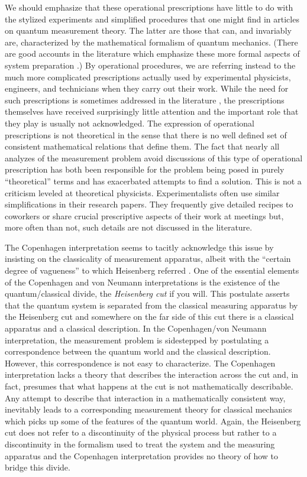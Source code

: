 \documentclass [12pt]{revtex4}
\begin{document}
We should emphasize that these operational prescriptions have little to do
with the stylized experiments and simplified procedures that one might
find in articles on quantum measurement theory.  The latter are those
that can, and invariably are, characterized by the mathematical formalism
of quantum mechanics. (There are good accounts in the literature which
emphasize these more formal aspects of system preparation \cite{L1969, B1998}.)
By operational procedures, we are referring instead to the much more
complicated prescriptions actually used by experimental physicists, engineers,
and technicians when they carry
out their work. While the need for such prescriptions is sometimes addressed
in the literature \cite{S1972, PB1992, P1995}, the prescriptions themselves have
 received surprisingly little attention and the important role that they play is
usually not acknowledged. The expression of operational prescriptions is not
{theoretical} in the sense that there is no well defined set
of consistent mathematical relations that define them. The fact that
nearly all analyzes of the measurement problem avoid discussions of
this type of operational prescription has both been responsible for
the problem being posed in purely ``theoretical'' terms and has
exacerbated attempts to find a solution. This is not a criticism leveled 
at theoretical physicists.
Experimentalists often use similar simplifications in their research
papers.  They frequently give detailed recipes to coworkers or
share crucial prescriptive aspects of their work at meetings but, more often
than not, such details are not discussed in the literature.

The Copenhagen interpretation
seems to tacitly acknowledge this issue by insisting on the classicality of
measurement apparatus, albeit with the ``certain degree of
vagueness'' to which Heisenberg referred \cite{S1972}.
One of the essential elements of the Copenhagen and von Neumann interpretations
is the existence of the quantum/classical divide, the \textit{Heisenberg cut}
if you will.  This postulate asserts that the quantum system is separated from
the classical measuring apparatus by the Heisenberg cut and somewhere on the far
side of this cut there is a classical apparatus and a classical description.
In the Copenhagen/von Neumann interpretation, the measurement problem is sidestepped 
by postulating a correspondence between the quantum world and
the classical description. However, this correspondence is not easy to characterize.
The Copenhagen interpretation lacks a theory that describes the interaction across the cut
and, in fact, presumes that what happens at the cut is not mathematically describable.
Any attempt to describe that interaction in a mathematically consistent way, inevitably
leads to a corresponding measurement theory for classical mechanics which picks up
some of the features of the quantum world. Again, the Heisenberg cut
does not refer to a discontinuity of the physical process but rather to
a discontinuity in the formalism used to treat the system and the measuring
apparatus and the Copenhagen interpretation provides no theory of how to
bridge this divide. 
\end{document}
